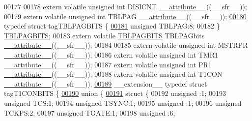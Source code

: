 \begin{DoxyCode}
00177 
00178 \textcolor{keyword}{extern} \textcolor{keyword}{volatile} \textcolor{keywordtype}{unsigned} \textcolor{keywordtype}{int}  DISICNT \hyperlink{a00015_a493c46f03454991ccc5aa7a6e1dfb2a7}{\_\_attribute\_\_}((\_\_sfr\_\_));
00179 \textcolor{keyword}{extern} \textcolor{keyword}{volatile} \textcolor{keywordtype}{unsigned} \textcolor{keywordtype}{int}  TBLPAG \hyperlink{a00015_a493c46f03454991ccc5aa7a6e1dfb2a7}{\_\_attribute\_\_}((\_\_sfr\_\_));
\hypertarget{a00015_source_l00180}{}\hyperlink{a00014}{00180} \textcolor{keyword}{typedef} \textcolor{keyword}{struct }tagTBLPAGBITS \{
\hypertarget{a00015_source_l00181}{}\hyperlink{a00014_a1d6a5ab1df407eb42a7e8453a04ec921}{00181}   \textcolor{keywordtype}{unsigned} TBLPAG:8;
00182 \} \hyperlink{a00014_dd/d7e/a00809}{TBLPAGBITS};
00183 \textcolor{keyword}{extern} \textcolor{keyword}{volatile} \hyperlink{a00014_dd/d7e/a00809}{TBLPAGBITS} TBLPAGbits \hyperlink{a00015_a493c46f03454991ccc5aa7a6e1dfb2a7}{\_\_attribute\_\_}((\_\_sfr\_\_));
00184 
00185 \textcolor{keyword}{extern} \textcolor{keyword}{volatile} \textcolor{keywordtype}{unsigned} \textcolor{keywordtype}{int}  MSTRPR \hyperlink{a00015_a493c46f03454991ccc5aa7a6e1dfb2a7}{\_\_attribute\_\_}((\_\_sfr\_\_));
00186 \textcolor{keyword}{extern} \textcolor{keyword}{volatile} \textcolor{keywordtype}{unsigned} \textcolor{keywordtype}{int}  TMR1 \hyperlink{a00015_a493c46f03454991ccc5aa7a6e1dfb2a7}{\_\_attribute\_\_}((\_\_sfr\_\_));
00187 \textcolor{keyword}{extern} \textcolor{keyword}{volatile} \textcolor{keywordtype}{unsigned} \textcolor{keywordtype}{int}  PR1 \hyperlink{a00015_a493c46f03454991ccc5aa7a6e1dfb2a7}{\_\_attribute\_\_}((\_\_sfr\_\_));
00188 \textcolor{keyword}{extern} \textcolor{keyword}{volatile} \textcolor{keywordtype}{unsigned} \textcolor{keywordtype}{int}  T1CON \hyperlink{a00015_a493c46f03454991ccc5aa7a6e1dfb2a7}{\_\_attribute\_\_}((\_\_sfr\_\_));
\hypertarget{a00015_source_l00189}{}\hyperlink{a00014}{00189} \_\_extension\_\_ \textcolor{keyword}{typedef} \textcolor{keyword}{struct }tagT1CONBITS \{
\hypertarget{a00015_source_l00190}{}\hyperlink{a00015}{00190}   \textcolor{keyword}{union }\{
\hypertarget{a00015_source_l00191}{}\hyperlink{a00015}{00191}     \textcolor{keyword}{struct }\{
00192       \textcolor{keywordtype}{unsigned} :1;
00193       \textcolor{keywordtype}{unsigned} TCS:1;
00194       \textcolor{keywordtype}{unsigned} TSYNC:1;
00195       \textcolor{keywordtype}{unsigned} :1;
00196       \textcolor{keywordtype}{unsigned} TCKPS:2;
00197       \textcolor{keywordtype}{unsigned} TGATE:1;
00198       \textcolor{keywordtype}{unsigned} :6;

\end{DoxyCode}

